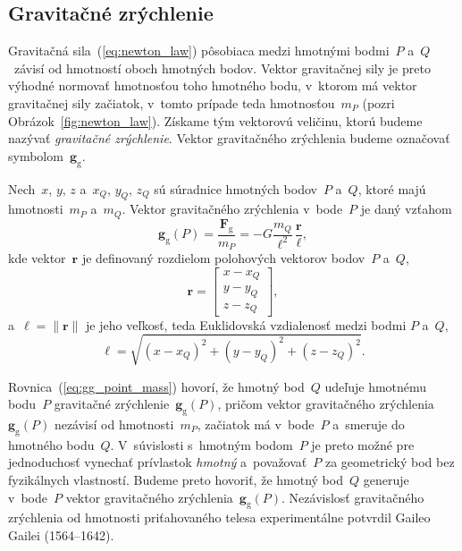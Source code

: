 \documentclass[a4paper, 12pt]{book}
\newcommand{\gidx}{\mathrm g}
\let\vec\mathbf
\begin{document}
\subsection{Gravitačné zrýchlenie}
\label{sec:gg}

Gravitačná sila~(\ref{eq:newton_law}) pôsobiaca medzi hmotnými bodmi~$P$ 
a~$Q$~závisí od hmotností oboch hmotných bodov.  Vektor gravitačnej sily je 
preto výhodné normovať hmotnosťou toho hmotného bodu, v~ktorom má vektor 
gravitačnej sily začiatok, v~tomto prípade teda hmotnosťou~$m_P$ (pozri 
Obrázok~\ref{fig:newton_law}).  Získame tým vektorovú veličinu, ktorú budeme 
nazývať \emph{gravitačné zrýchlenie}.  Vektor gravitačného zrýchlenia budeme 
označovať symbolom~$\vec g_\gidx$.

Nech~$x$, $y$, $z$ a~$x_Q$, $y_Q$, $z_Q$ sú súradnice hmotných bodov~$P$ a~$Q$, 
ktoré majú hmotnosti~$m_P$ a~$m_Q$.  Vektor gravitačného zrýchlenia v~bode~$P$ 
je daný vzťahom
%
\begin{equation}
\label{eq:gg_point_mass}
\vec g_\gidx(P) = \frac{\vec F_\gidx}{m_P} = -G \frac{m_Q}{\ell^2} \, 
\frac{\vec r}{\ell}{,}
\end{equation}
%
kde vektor~$\vec r$ je definovaný rozdielom polohových vektorov bodov~$P$ 
a~$Q$,
%
\begin{equation}
\label{eq:r}
\vec r =
%
\begin{bmatrix}
x - x_Q \\
y - y_Q \\
z - z_Q
\end{bmatrix}
{,}
\end{equation}
%
a~$\ell = \| \vec r \|$ je jeho veľkosť, teda Euklidovská vzdialenosť medzi 
bodmi $P$ a~$Q$,
%
\begin{equation}
\label{eq:l}
\ell = \sqrt{(x - x_Q)^2 + (y - y_Q)^2 + (z - z_Q)^2}{.}
\end{equation}

Rovnica~(\ref{eq:gg_point_mass}) hovorí, že hmotný
bod~$Q$ udeľuje hmotnému bodu~$P$ gravitačné zrýchlenie~$\vec g_\gidx(P)$, 
pričom vektor gravitačného zrýchlenia~$\vec g_\gidx(P)$ nezávisí od 
hmotnosti~$m_P$, začiatok má v~bode~$P$ a~smeruje do hmotného bodu~$Q$.  
V~súvislosti
s~hmotným bodom~$P$ je preto možné pre jednoduchosť vynechať prívlastok
\emph{hmotný} a~považovať~$P$ za geometrický bod bez fyzikálnych vlastností.  
Budeme preto hovoriť, že hmotný bod~$Q$ generuje v~bode~$P$ vektor gravitačného 
zrýchlenia~$\vec g_\gidx(P)$.  Nezávislosť gravitačného zrýchlenia od hmotnosti 
priťahovaného telesa experimentálne potvrdil Gaileo Gailei (1564--1642).
\end{document}
